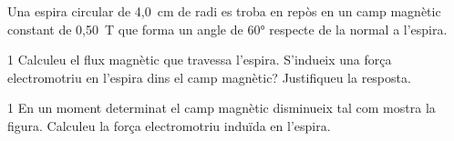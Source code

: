 Una espira circular de 4,0~cm de radi es troba en repòs en un camp magnètic constant de 0,50~T que forma un angle de 60° respecte de la normal a l'espira.


\begin{apartat}{1}
Calculeu el flux magnètic que travessa l'espira. S'indueix una força electromotriu en l'espira dins el camp magnètic? Justifiqueu la resposta.
\end{apartat}

\begin{apartat}{1}
En un moment determinat el camp magnètic disminueix tal com mostra la figura. Calculeu la força electromotriu induïda en l'espira.
\end{apartat}
